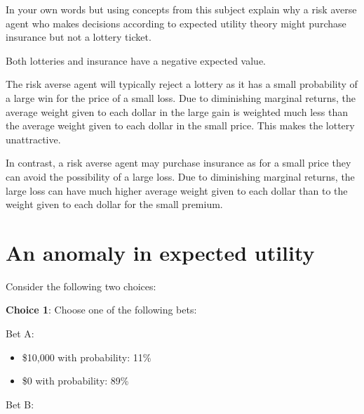 \documentclass[
  letterpaper,
  DIV=11,
  numbers=noendperiod]{scrreprt}
\providecommand{\tightlist}{%
  \setlength{\itemsep}{0pt}\setlength{\parskip}{0pt}}\usepackage{longtable,booktabs,array}
\begin{document}
In your own words but using concepts from this subject explain why a
risk averse agent who makes decisions according to expected utility
theory might purchase insurance but not a lottery ticket.

\begin{tcolorbox}[enhanced jigsaw, title=\textcolor{quarto-callout-tip-color}{\faLightbulb}\hspace{0.5em}{Answer}, toprule=.15mm, colback=white, breakable, titlerule=0mm, colframe=quarto-callout-tip-color-frame, coltitle=black, opacityback=0, rightrule=.15mm, colbacktitle=quarto-callout-tip-color!10!white, bottomtitle=1mm, opacitybacktitle=0.6, arc=.35mm, bottomrule=.15mm, toptitle=1mm, leftrule=.75mm, left=2mm]

Both lotteries and insurance have a negative expected value.

The risk averse agent will typically reject a lottery as it has a small
probability of a large win for the price of a small loss. Due to
diminishing marginal returns, the average weight given to each dollar in
the large gain is weighted much less than the average weight given to
each dollar in the small price. This makes the lottery unattractive.

In contrast, a risk averse agent may purchase insurance as for a small
price they can avoid the possibility of a large loss. Due to diminishing
marginal returns, the large loss can have much higher average weight
given to each dollar than to the weight given to each dollar for the
small premium.

\end{tcolorbox}

\hypertarget{an-anomaly-in-expected-utility}{%
\section{An anomaly in expected
utility}\label{an-anomaly-in-expected-utility}}

Consider the following two choices:

\textbf{Choice 1}: Choose one of the following bets:

Bet A:

\begin{itemize}
\tightlist
\item
  \$10,000 with probability: 11\%
\item
  \$0 with probability: 89\%
\end{itemize}

Bet B:
\end{document}
